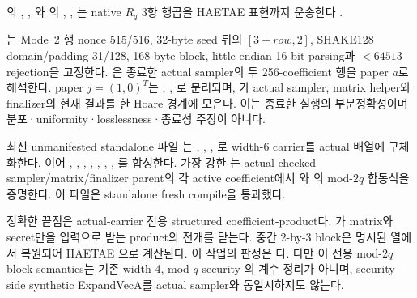 의
, ,
와
의
,
,
는 native \(R_q\)
3항 행곱을 HAETAE  표현까지 운송한다
\cite{post-freeze-kg-rq-haetae-report}.

\begin{verified}
는 Mode~2 행 nonce 515/516,
32-byte seed 뒤의 \([3+row,2]\), SHAKE128 domain/padding 31/128,
168-byte block, little-endian 16-bit parsing과 \(<64513\) rejection을 고정한다.
은 종료한 actual sampler의 두
256-coefficient 행을 paper \(a\)로 해석한다. paper \(j=(1,0)^T\)는
,
,
로 분리되며,
가 actual sampler,
matrix helper와 finalizer의 현재 결과를 한 Hoare 경계에 모은다. 이는 종료한
실행의 부분정확성이며 분포·uniformity·losslessness·종료성 주장이 아니다.
\end{verified}

\begin{verified}
최신 unmanifested standalone 파일
는
,
,
,
로 width-6 carrier를 actual 배열에
구체화한다. 이어
,
,
,
,
,
,
,
를 합성한다. 가장 강한
는
actual checked sampler/matrix/finalizer parent의 각 active coefficient에서
와
의 mod-\(2q\) 합동식을 증명한다. 이 파일은
standalone  fresh compile을 통과했다.

정확한 끝점은 actual-carrier 전용 structured coefficient-product다.
가 matrix와 secret만을 입력으로 받는
product의 전개를 닫는다. 중간 2-by-3 block은 명시된 열에서 복원되어
HAETAE 으로 계산된다. 이 작업의 판정은
\FaithfulAugmentedVerdict 다. 다만 이 전용 mod-\(2q\) block semantics는 기존
width-4, mod-\(q\) security 의 계수 정리가 아니며,
security-side synthetic ExpandVecA를 actual sampler와 동일시하지도 않는다.
\cite{post-freeze-kg-faithful-augmented-report}
\end{verified}

